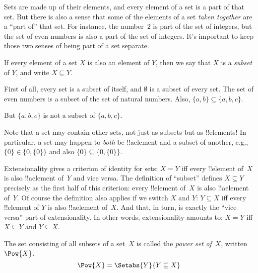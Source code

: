 \documentclass[../../../include/open-logic-section]{subfiles}
\begin{document}

\begin{explain}
Sets are made up of their elements, and every element of a set is a
part of that set. But there is also a sense that some of the elements
of a set \emph{taken together} are a ``part of'' that set. For
instance, the number~$2$ is part of the set of integers, but the set
of even numbers is also a part of the set of integers. It's important
to keep those two senses of being part of a set separate.
\end{explain}

\begin{defn}[Subset]
If every element of a set $X$ is also an element of
    $Y$, then we say that $X$ is a \emph{subset} of $Y$, and write $X
    \subseteq Y$.
\end{defn}

\begin{ex}
First of all, every set is a subset of itself, and $\emptyset$ is a
subset of every set. The set of even numbers is a subset of the set of
natural numbers. Also, $\{ a, b \} \subseteq \{ a, b, c \}$.

But $\{ a, b, e \}$ is not a subset of $\{ a, b, c \}$.
\end{ex}

\begin{explain}
Note that a set may contain other sets, not just as subsets but as
!!{element}s!{} In particular, a set may happen to \emph{both} be 
!!a{element} and a subset of another, e.g., $\{0\} \in \{0, \{0\}\}$
and also $\{0\} \subseteq \{0, \{0\}\}$.
\end{explain}

\begin{explain}
Extensionality gives a criterion of identity for sets: $X = Y$ iff
every !!{element} of~$X$ is also !!a{element} of~$Y$ and vice versa.
The definition of ``subset'' defines $X \subseteq Y$ precisely as the first
half of this criterion: every !!{element} of~$X$ is also !!a{element}
of~$Y$. Of course the definition also applies if we switch $X$ and
$Y$: $Y \subseteq X$ iff every !!{element} of $Y$ is also !!a{element}
of~$X$. And that, in turn, is exactly the ``vice versa'' part of
extensionality. In other words, extensionality amounts to: $X = Y$
iff $X \subseteq Y$ and $Y \subseteq X$.
\end{explain}

\begin{defn}
The set consisting of all subsets of a set~$X$ is called the
\emph{power set of}~$X$, written $\Pow{X}$.
    \[\Pow{X} = \Setabs{Y}{Y \subseteq X} \]
\end{defn}
\end{document}
